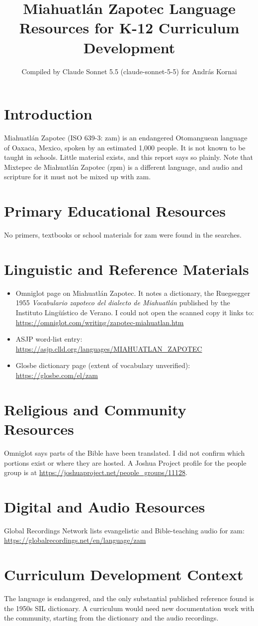 \documentclass[12pt]{article}
\title{Miahuatl\'an Zapotec Language Resources for K-12 Curriculum Development}
\author{Compiled by Claude Sonnet 5.5 (claude-sonnet-5-5) for Andr\'as Kornai}
\date{}
\begin{document}
\maketitle

\section{Introduction}
Miahuatl\'an Zapotec (ISO 639-3: zam) is an endangered Otomanguean language of Oaxaca, Mexico, spoken by an estimated 1,000 people. It is not known to be taught in schools. Little material exists, and this report says so plainly. Note that Mixtepec de Miahuatl\'an Zapotec (zpm) is a different language, and audio and scripture for it must not be mixed up with zam.

\section{Primary Educational Resources}
No primers, textbooks or school materials for zam were found in the searches.

\section{Linguistic and Reference Materials}
\begin{itemize}
\item Omniglot page on Miahuatl\'an Zapotec. It notes a dictionary, the Ruegsegger 1955 \emph{Vocabulario zapoteco del dialecto de Miahuatl\'an} published by the Instituto Ling\"u\'istico de Verano. I could not open the scanned copy it links to: \url{https://omniglot.com/writing/zapotec-miahuatlan.htm}
\item ASJP word-list entry: \url{https://asjp.clld.org/languages/MIAHUATLAN_ZAPOTEC}
\item Glosbe dictionary page (extent of vocabulary unverified): \url{https://glosbe.com/el/zam}
\end{itemize}

\section{Religious and Community Resources}
Omniglot says parts of the Bible have been translated. I did not confirm which portions exist or where they are hosted. A Joshua Project profile for the people group is at \url{https://joshuaproject.net/people_groups/11128}.

\section{Digital and Audio Resources}
Global Recordings Network lists evangelistic and Bible-teaching audio for zam: \url{https://globalrecordings.net/en/language/zam}

\section{Curriculum Development Context}
The language is endangered, and the only substantial published reference found is the 1950s SIL dictionary. A curriculum would need new documentation work with the community, starting from the dictionary and the audio recordings.
\end{document}

